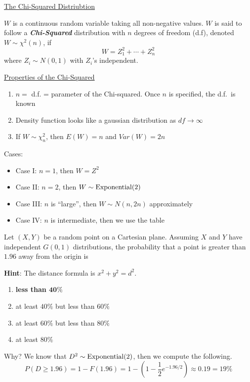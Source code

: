 \underline{The Chi-Squared Distriubtion}
\begin{defbox}
    \begin{definition}
        $ W $ is a continuous random variable taking all non-negative values.
        $ W $ is said to follow a \textbf{\emph{Chi-Squared}} distribution
        with $ n $ degrees of freedom (d.f), denoted $ W \sim \chi^2(n) $,
        if
        \[ W=Z_1^2+\cdots+Z_n^2 \]
        where $ Z_i \sim N(0,1) $ with $ Z_i $'s independent.
    \end{definition}
\end{defbox}
\underline{Properties of the Chi-Squared}
\begin{enumerate}[label=(\roman*)]
    \item $ n= $ d.f. = parameter of the Chi-squared. Once $ n $ is specified, the d.f.\ is known
    \item Density function looks like a gaussian distribution as $ df\rightarrow\infty $
    \item If $ W \sim \chi^2_n $, then $ E(W)=n $ and $ Var(W)=2n $
\end{enumerate}
Cases:
\begin{itemize}
    \item Case I\@: $ n=1 $, then $ W=Z^2 $
    \item Case II\@: $ n=2 $, then $ W \sim \operatorname{Exponential}(2) $
    \item Case III\@: $ n $ is ``large'', then $ W \sim N(n,2n) $ approximately
    \item Case IV\@: $ n $ is intermediate, then we use the table
\end{itemize}

Let $ (X,Y) $ be a random point on a Cartesian plane. Assuming $ X $ and $ Y $
have independent $ G(0,1) $ distributions, the probability that a point is greater
than $ 1.96 $ away from the origin is

\textbf{Hint}: The distance formula is $ x^2+y^2=d^2 $.
\begin{enumerate}[label=(\Alph*)]
    \item \textbf{less than $ \bm{40\%} $}
    \item at least $ 40\% $ but less than $ 60\% $
    \item at least $ 60\% $ but less than $ 80\% $
    \item at least $ 80\% $
\end{enumerate}
Why? We know that $ D^2 \sim \operatorname{Exponential}(2) $, then we compute the following.
\[ P(D\geqslant 1.96)=1-F(1.96)=1-\left( 1-\frac{1}{2} e^{-1.96/2} \right)\approx 0.19=19\% \]


